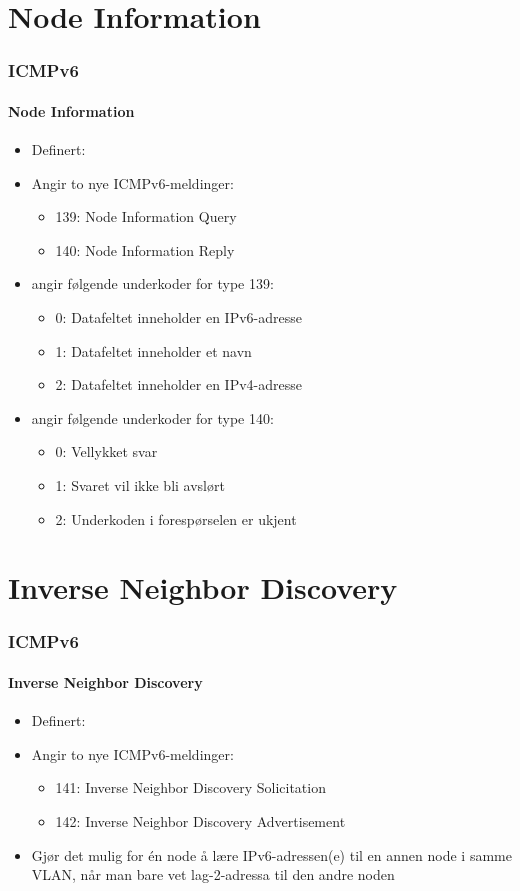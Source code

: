 \section{Node Information}
\begin{frame}
  \frametitle{ICMPv6}
  \framesubtitle{Node Information}
  \begin{itemize}
  \item Definert: 
  \item Angir to nye ICMPv6-meldinger:
    \begin{itemize}
    \item 139: Node Information Query
    \item 140: Node Information Reply
    \end{itemize}
  \item {} angir
    følgende underkoder for type 139:
    \begin{itemize}
    \item 0: Datafeltet inneholder en IPv6-adresse
    \item 1: Datafeltet inneholder et navn
    \item 2: Datafeltet inneholder en IPv4-adresse
    \end{itemize}
  \item {} angir
    følgende underkoder for type 140:
    \begin{itemize}
    \item 0: Vellykket svar
    \item 1: Svaret vil ikke bli avslørt
    \item 2: Underkoden i forespørselen er ukjent
    \end{itemize}
  \end{itemize}
\end{frame}

\section{Inverse Neighbor Discovery}
\begin{frame}
  \frametitle{ICMPv6}
  \framesubtitle{Inverse Neighbor Discovery}
  \begin{itemize}
  \item Definert: 
  \item Angir to nye ICMPv6-meldinger:
    \begin{itemize}
    \item 141: Inverse Neighbor Discovery Solicitation
    \item 142: Inverse Neighbor Discovery Advertisement
    \end{itemize}
  \item Gjør det mulig for én node å lære IPv6-adressen(e) til en
    annen node i samme VLAN, når man bare vet lag-2-adressa til den
    andre noden
  \end{itemize}
\end{frame}

